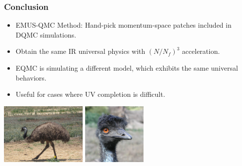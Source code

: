 \documentclass[xcolor=table, 10pt, aspectratio=43]{beamer}
\begin{document}
\begin{frame}
  \frametitle{Conclusion}
  \begin{itemize}
    \item EMUS-QMC Method: Hand-pick momentum-space patches included in DQMC simulations.
    \item Obtain the same IR universal physics with $(N/N_f)^3$ acceleration.
    \item EQMC is simulating a \alert{different} model, which exhibits the same universal behaviors.
    \item Useful for cases where UV completion is difficult.
  \end{itemize}
  \begin{center}
    \includegraphics[height=3cm]{emu}
    \includegraphics[height=3cm]{emu2}
  \end{center}
\end{frame}
\end{document}
